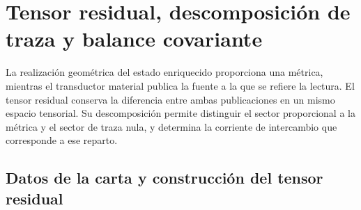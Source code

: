 %

\section{Tensor residual, descomposición de traza y balance covariante}
\label{vii:sec:tensor-residual-balance}

La realización geométrica del estado enriquecido proporciona una métrica,
mientras el transductor material publica la fuente a la que se refiere la
lectura. El tensor residual conserva la diferencia entre ambas publicaciones
en un mismo espacio tensorial. Su descomposición permite distinguir el
sector proporcional a la métrica y el sector de traza nula, y determina
la corriente de intercambio que corresponde a ese reparto.

\subsection{Datos de la carta y construcción del tensor residual}
\label{vii:subsec:datos-tensor-residual}

